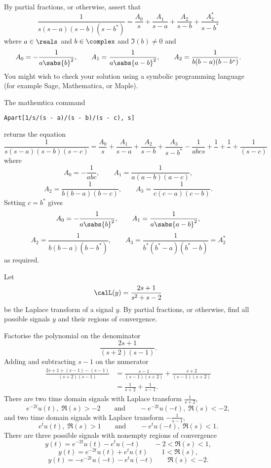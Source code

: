\begin{excersizelist}
\item \label{exer:partialfracfourthorder} By partial fractions, or otherwise, assert that
\[
\frac{1}{s(s-a)(s-b)(s-b^*)} = \frac{A_0}{s} + \frac{A_1}{s-a} + \frac{A_2}{s-b} + \frac{A_2^*}{s-b^*}
\]
where $a \in \reals$ and $b \in \complex$ and $\Im(b) \neq 0$ and
\[
A_0 = -\frac{1}{a\sabs{b}^2}, \qquad A_1 =  \frac{1}{a\sabs{a - b}^2}, \qquad A_2 = \frac{1}{b(b-a)(b-b^*)}.
\]
You might wish to check your solution using a symbolic programming language (for example Sage, Mathematica, or Maple).
\begin{solution}
The mathemtica command
\begin{verbatim}
Apart[1/s/(s - a)/(s - b)/(s - c), s]
\end{verbatim}
returns the equation
\[
\frac{1}{s(s-a)(s-b)(s-c)} = \frac{A_0}{s} + \frac{A_1}{s-a} + \frac{A_2}{s-b} + \frac{A_3}{s-b^*} -\frac{1}{a b c s}+\frac{1}{}+\frac{1}{}+\frac{1}{ (s-c)}
\]
where
\[
A_0 = -\frac{1}{abc}, \qquad A_1 =  \frac{1}{a (a-b) (a-c)}, 
\]
\[
A_2 = \frac{1}{b (b-a) (b-c)}, \qquad A_3 = \frac{1}{c (c-a) (c-b)}.
\]
Setting $c = b^*$ gives
\[
A_0 = -\frac{1}{a\sabs{b}^2}, \qquad A_1 =  \frac{1}{a\sabs{a - b}^2}, 
\]
\[ 
A_2 = \frac{1}{b(b-a)(b-b^*)}, \qquad A_3 = \frac{1}{b^*(b^*-a)(b^*-b)} = A_2^*
\]
as required.
\end{solution}


\item Let
\[
\calL(y) = \frac{2s + 1}{s^2 + s - 2}
\]
be the Laplace transform of a signal $y$.  By partial fractions, or otherwise, find all possible signals $y$ and their regions of convergence. 
\begin{solution}
Factorise the polynomial on the denominator
\[
\frac{2s + 1}{(s+2)(s-1)}.
\]
Adding and subtracting $s-1$ on the numerator 
\begin{align*}
\frac{2s + 1 + (s-1) - (s-1)}{(s+2)(s-1)} &= \frac{s-1}{(s-1)(s+2)} + \frac{s+2}{(s-1)(s+2)} \\
&= \frac{1}{s+2} + \frac{1}{s-1}.
\end{align*}
There are two time domain signals with Laplace transform $\frac{1}{s+2}$,
\[
e^{-2t} u(t), \; \Re(s) > -2 \qquad \text{and} \qquad -e^{-2t}u(-t), \; \Re(s) < -2,
\] 
and two time domain signals with Laplace transform $-\frac{1}{s-1}$,
 \[
e^{t}u(t), \; \Re(s) > 1 \qquad \text{and} \qquad -e^{t} u(-t), \; \Re(s) < 1.
\] 
There are three possible signals with nonempty regions of convergence
\[
y(t) = e^{-2t} u(t) - e^{t} u(-t) \qquad -2 < \Re(s) < 1,
\]
\[
y(t) = e^{-2t} u(t) + e^{t} u(t) \qquad 1 < \Re(s),
\]
\[
y(t) = - e^{-2t} u(-t) - e^{t} u(-t) \qquad \Re(s) < -2.
\]
\end{solution}


\end{excersizelist}
